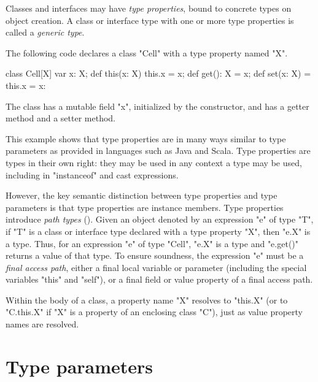 
        Classes and interfaces may have {\em type properties}, bound
        to concrete types on object creation.
        A class or interface type
        with one or more type properties is called a {\em
        generic type}.

The following code declares a class \xcd"Cell" with a type
property named \xcd"X".
\begin{xten}
class Cell[X] {
    var x: X;
    def this(x: X) { this.x = x; }
    def get(): X = x;
    def set(x: X) = { this.x = x: }
}
\end{xten}
The class has a mutable field \xcd"x", initialized by the
constructor, and has a getter method and a setter method.

This example shows that type properties are in many ways similar to
type parameters as provided in languages such as Java and Scala.
Type properties are types in their own right:
they may be used in any context a type may be used,
including in \xcd"instanceof" and cast expressions.

However, the key semantic distinction between type properties
and type parameters is that type properties are instance
members.
%
        Type properties introduce {\em path types}
        ().
        Given an object
        denoted by an expression \xcd"e" of type \xcd"T",
        if \xcd"T" is a class or interface type declared with
        a type property \xcd"X", then \xcd"e.X" is a type.
Thus, for an expression \xcd"e" of type \xcd"Cell", \xcd"e.X" is a type
and \xcd"e.get()" returns a value of that type.
%
        To ensure soundness, the expression \xcd"e"
        must be a \emph{final access path}, either a final
        local variable or parameter (including the special variables
        \xcd"this" and \xcd"self"), or a final field or value
        property of a final access path.

Within the body of a class, a property name \xcd"X" resolves
to \xcd"this.X" (or to \xcd"C.this.X" if \xcd"X" is a property of
an enclosing class \xcd"C"), just as value property names are
resolved.

\section{Type parameters}
\label{TypeParameters}


